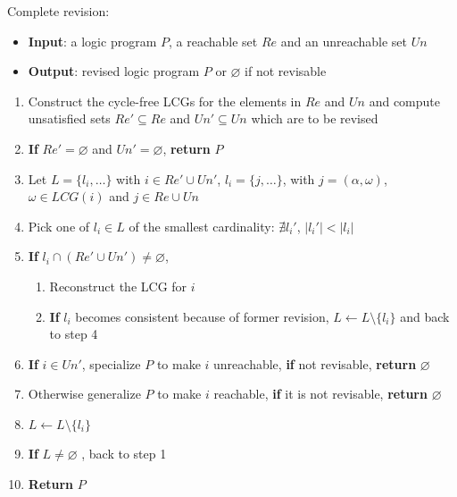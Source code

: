     \noindent
    \begin{minipage}{\linewidth}
    \vspace{1em}
    Complete revision:
    \begin{itemize}
        \item \textbf{Input}: a logic program $P$, a reachable set $Re$ and an unreachable set $Un$
        \item \textbf{Output}: revised logic program $P$ or $\varnothing$ if not revisable
    \end{itemize}
    \begin{enumerate}
        \item Construct the cycle-free LCGs for the elements in $Re$ and $Un$ and compute unsatisfied sets $Re'\subseteq Re$ and $Un'\subseteq Un$ which are to be revised
        \item \textbf{If} $Re'=\varnothing$ and $Un'=\varnothing$, \textbf{return} $P$
        \item Let $L=\{l_i,\ldots\}$ with $i\in Re' \cup Un'$, $l_i=\{j,\ldots\}$, with $j=(\alpha,\omega)$, $\omega \in LCG(i)$ and $ j\in Re\cup Un$ \label{step:dependency}
        \item Pick one of $l_i\in L$ of the smallest cardinality: $\nexists l_i'$, $|l_i'| < |l_i|$ \label{step:cardinality}
        \item \textbf{If} $l_i\cap (Re'\cup Un')\neq\varnothing$, \label{step:check}
        \begin{enumerate}
            \item Reconstruct the LCG for $i$
            \item \textbf{If} $l_i$ becomes consistent because of former revision, $L\gets L\setminus \{l_i\}$ and back to step 4
        \end{enumerate}
        \item \textbf{If} $i\in Un'$, specialize $P$ to make $i$ unreachable, \textbf{if} not revisable, \textbf{return} $\varnothing$ \label{step:specialize}
        \item Otherwise generalize $P$ to make $i$ reachable, \textbf{if} it is not revisable, \textbf{return} $\varnothing$ \label{step:generalize}
        
        \item $L\gets L\setminus\{l_i\}$ \label{step:update}
        \item \textbf{If} $L\neq\varnothing$ , back to step 1 \label{step:recheck}
        \item \textbf{Return} $P$
    \end{enumerate} 
    \vspace{0.1em}
    \end{minipage}
    
